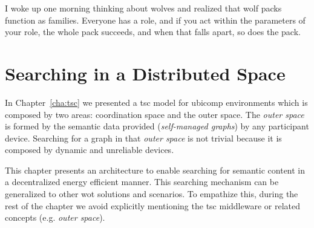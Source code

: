 
\begin{savequote}[50mm]
I woke up one morning thinking about wolves and realized that wolf packs function as families.
Everyone has a role, and if you act within the parameters of your role, the whole pack succeeds, and when that falls apart, so does the pack.
\end{savequote}


\chapter{Searching in a Distributed Space}
\label{cha:searching}


\newcommand{\Space}{\emph{Space}} %
\newcommand{\Spaces}{\emph{Spaces}} %
\newcommand{\consumer}{\emph{Consumer}}
\newcommand{\consumers}{\emph{Consumers}}
\newcommand{\provider}{\emph{Provider}}
\newcommand{\providers}{\emph{Providers}}
\newcommand{\clue}{\emph{clue}}
\newcommand{\clues}{\emph{clues}}


\ifpdf
    \graphicspath{{\pathchapfive/figures/PNG/}{\pathchapfive/figures/PDF/}{\pathchapfive/figures/}}
\else
    \graphicspath{{\pathchapfive/figures/EPS/}{\pathchapfive/figures/}}
\fi



In Chapter~\ref{cha:tsc} we presented a \ac{tsc} model for \ac{ubicomp} environments which is composed by two areas: coordination space and the outer space.
The \emph{outer space} is formed by the semantic data provided (\emph{self-managed graphs}) by any participant device.
Searching for a graph in that \emph{outer space} is not trivial because it is composed by dynamic and unreliable devices.

This chapter presents an architecture to enable searching for semantic content in a decentralized energy efficient manner.
This searching mechanism can be generalized to other \ac{wot} solutions and scenarios.
To empathize this, during the rest of the chapter we avoid explicitly mentioning the \ac{tsc} middleware or related concepts (e.g. \emph{outer space}).

